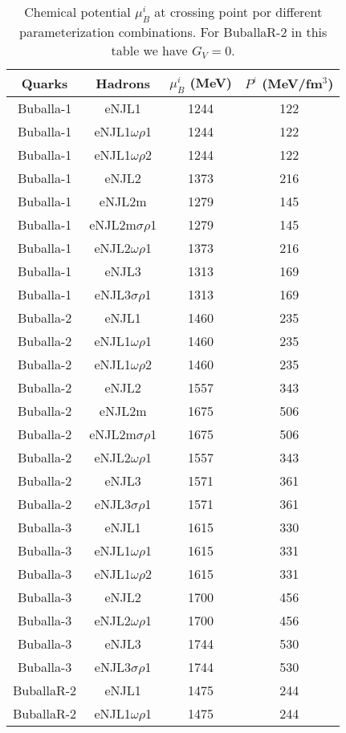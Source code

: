 \documentclass{ws-ijmpcs}
\begin{document}
\begin{table}[!htpb]
\centering
\caption{Chemical potential $\mu_B^i$ at crossing point por different parameterization combinations. For BuballaR-2 in this table we have $G_V = 0$.\label{Tab:Transition_chemical_pot}}
\begin{ruledtabular}
\begin{tabular}{cccc}
Quarks & Hadrons & $\mu_B^i$ (MeV) & $P^i$ (MeV/fm$^3$) \\
\hline
Buballa-1 & eNJL1 & 1244 & 122\\
Buballa-1 & eNJL1$\omega\rho$1 & 1244 & 122 \\
Buballa-1 & eNJL1$\omega\rho$2 & 1244 & 122 \\
Buballa-1 & eNJL2 & 1373 & 216\\
Buballa-1 & eNJL2m & 1279 & 145\\
Buballa-1 & eNJL2m$\sigma\rho$1 & 1279 & 145 \\
Buballa-1 & eNJL2$\omega\rho$1 & 1373 & 216 \\
Buballa-1 & eNJL3 & 1313 & 169\\
Buballa-1 & eNJL3$\sigma\rho$1 & 1313 & 169 \\
Buballa-2 & eNJL1 & 1460 & 235\\
Buballa-2 & eNJL1$\omega\rho$1 & 1460 & 235 \\
Buballa-2 & eNJL1$\omega\rho$2 & 1460 & 235 \\
Buballa-2 & eNJL2 & 1557 & 343\\
Buballa-2 & eNJL2m & 1675 & 506\\
Buballa-2 & eNJL2m$\sigma\rho$1 & 1675 & 506 \\
Buballa-2 & eNJL2$\omega\rho$1 & 1557 & 343 \\
Buballa-2 & eNJL3 & 1571 & 361 \\
Buballa-2 & eNJL3$\sigma\rho$1 & 1571 & 361 \\
Buballa-3 & eNJL1 & 1615 & 330\\
Buballa-3 & eNJL1$\omega\rho$1 & 1615 & 331 \\
Buballa-3 & eNJL1$\omega\rho$2 & 1615 & 331 \\
Buballa-3 & eNJL2 & 1700 & 456 \\
Buballa-3 & eNJL2$\omega\rho$1 & 1700 & 456 \\
Buballa-3 & eNJL3 & 1744 & 530\\
Buballa-3 & eNJL3$\sigma\rho$1 & 1744 & 530 \\
BuballaR-2 & eNJL1 & 1475 & 244 \\
BuballaR-2 & eNJL1$\omega\rho$1 & 1475 & 244 \\

\end{tabular}
\end{ruledtabular}
\end{table}
\end{document}
